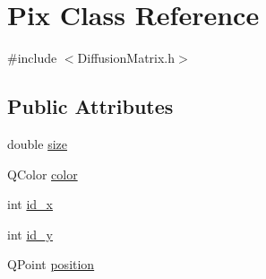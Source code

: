 \hypertarget{class_pix}{\section{Pix Class Reference}
\label{class_pix}
}


{\ttfamily \#include $<$Diffusion\+Matrix.\+h$>$}

\subsection*{Public Attributes}
\begin{DoxyCompactItemize}
\item 
double \hyperlink{class_pix_aaac7fdd5128a92819572c41b2e89c736}{size}
\item 
Q\+Color \hyperlink{class_pix_adb434da0394ea10d83bbd65982720ef1}{color}
\item 
int \hyperlink{class_pix_a277b6fbe5c42043d58493de50c9b12fc}{id\+\_\+x}
\item 
int \hyperlink{class_pix_a5fcf097e21af62c9fe0d989c0dd97c08}{id\+\_\+y}
\item 
Q\+Point \hyperlink{class_pix_aa8c4ee0a6267df92adc58a0607eec53d}{position}
\end{DoxyCompactItemize}


